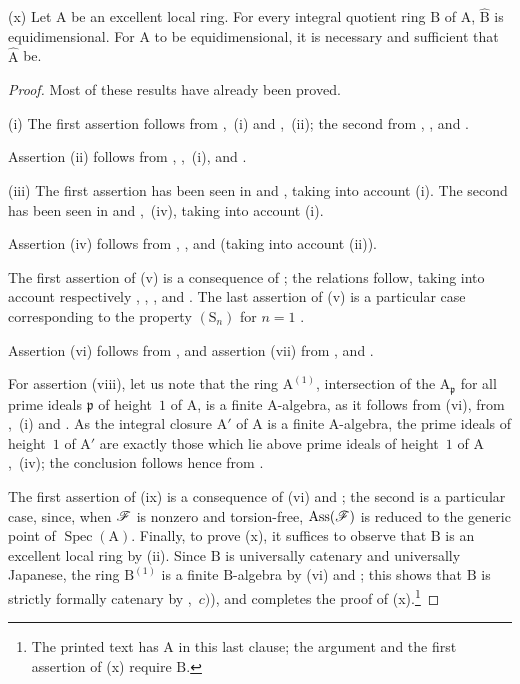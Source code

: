 \begin{scholium}[7.8.3]

(x) Let $\mathrm{A}$ be an excellent local ring. For every integral quotient ring $\mathrm{B}$ of $\mathrm{A}$, $\widehat{\mathrm{B}}$ is equidimensional. For $\mathrm{A}$ to be equidimensional, it is necessary and sufficient that $\widehat{\mathrm{A}}$ be.
\end{scholium}

\begin{proof}
Most of these results have already been proved.

(i) The first assertion follows from ,~(i) and ,~(ii); the second from , ,  and .

Assertion (ii) follows from , ,~(i),  and .

(iii) The first assertion has been seen in  and , taking into account (i). The second has been seen in  and ,~(iv), taking into account (i).

Assertion (iv) follows from , ,  and  (taking into account (ii)).

The first assertion of (v) is a consequence of ; the relations  follow, taking into account respectively , , ,  and . The last assertion of (v) is a particular case corresponding to the property $(\mathrm{S}_n)$ for $n=1$ .

Assertion (vi) follows from , and assertion (vii) from ,  and .

For assertion (viii), let us note that the ring $\mathrm{A}^{(1)}$, intersection of the $\mathrm{A}_\mathfrak{p}$ for all prime ideals $\mathfrak{p}$ of height~$1$ of $\mathrm{A}$, is a finite $\mathrm{A}$-algebra, as it follows from (vi), from ,~(i) and . As the integral closure $\mathrm{A}'$ of $\mathrm{A}$ is a finite $\mathrm{A}$-algebra, the prime ideals of height~$1$ of $\mathrm{A}'$ are exactly those which lie above prime ideals of height~$1$ of $\mathrm{A}$ ,~(iv); the conclusion follows hence from .

The first assertion of (ix) is a consequence of (vi) and ; the second is a particular case, since, when $\mathscr{F}$ is nonzero and torsion-free, $\operatorname{Ass}(\mathscr{F})$ is reduced to the generic point of $\operatorname{Spec}(\mathrm{A})$. Finally, to prove (x), it suffices to observe that $\mathrm{B}$ is an excellent local ring by (ii). Since $\mathrm{B}$ is universally catenary and universally Japanese, the ring $\mathrm{B}^{(1)}$ is a finite $\mathrm{B}$-algebra by (vi) and ; this shows that $\mathrm{B}$ is strictly formally catenary by ,~$c)$), and completes the proof of (x).\footnote{The printed text has $\mathrm{A}$ in this last clause; the argument and the first assertion of (x) require $\mathrm{B}$.}
\end{proof}

